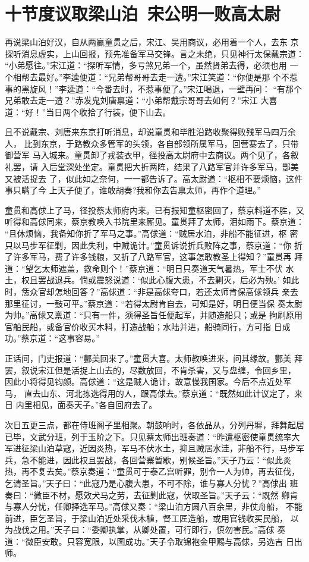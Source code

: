 \chapter{十节度议取梁山泊~宋公明一败高太尉}

再说梁山泊好汉，自从两赢童贯之后，宋江、吴用商议，必用着一个人，去东
京探听消息虚实，上山回报，预先准备军马交锋。言之未绝，只见神行太保戴宗道：
“小弟愿往。”宋江道：“探听军情，多亏煞兄弟一个，虽然贤弟去得，必须也用
一个相帮去最好。”李逵便道：“兄弟帮哥哥去走一遭。”宋江笑道：“你便是那
个不惹事的黑旋风！”李逵道：“今番去时，不惹事便了。”宋江喝退，一壁再问：
“有那个兄弟敢去走一遭？”赤发鬼刘唐禀道：“小弟帮戴宗哥哥去如何？”宋江
大喜道：“好！”当日两个收拾了行装，便下山去。

且不说戴宗、刘唐来东京打听消息，却说童贯和毕胜沿路收聚得败残军马四万余人，
比到东京，于路教众多管军的头领，各自部领所属军马，回营寨去了，只带御营军
马入城来。童贯卸了戎装衣甲，径投高太尉府中去商议。两个见了，各叙礼罢，请
入后堂深处坐定。童贯把大折两阵，结果了八路军官并许多军马，酆美又被活捉去
了，似此如之奈何，一一都告诉了。高太尉道：“枢相不要烦恼，这件事只瞒了今
上天子便了，谁敢胡奏?我和你去告禀太师，再作个道理。”

童贯和高俅上了马，径投蔡太师府内来。已有报知童枢密回了，蔡京料道不胜，又
听得和高俅同来，蔡京教唤入书院里来厮见。童贯拜了太师，泪如雨下。蔡京道：
“且休烦恼，我备知你折了军马之事。”高俅道：“贼居水泊，非船不能征进，枢
密只以马步军征剿，因此失利，中贼诡计。”童贯诉说折兵败阵之事，蔡京道：“你
折了许多军马，费了许多钱粮，又折了八路军官，这事怎敢教圣上得知？”童贯再
拜道：“望乞太师遮盖，救命则个！”蔡京道：“明日只奏道天气暑热，军士不伏
水土，权且罢战退兵。倘或震怒说道：‘似此心腹大患，不去剿灭，后必为殃。’
如此时，恁众官却怎地回答？”高俅道：“非是高俅夸口，若还太师肯保高俅领兵
亲去那里征讨，一鼓可平。”蔡京道：“若得太尉肯自去，可知是好，明日便当保
奏太尉为帅。”高俅又禀道：“只有一件，须得圣旨任便起军，并随造船只；或是
拘刷原用官船民船，或备官价收买木料，打造战船；水陆并进，船骑同行，方可指
日成功。”蔡京道：“这事容易。”

正话间，门吏报道：“酆美回来了。”童贯大喜。太师教唤进来，问其缘故。酆美
拜罢，叙说宋江但是活捉上山去的，尽数放回，不肯杀害，又与盘缠，令回乡里，
因此小将得见钧颜。高俅道：“这是贼人诡计，故意慢我国家。今后不点近处军马，
直去山东、河北拣选得用的人，跟高俅去。”蔡京道：“既然如此计议定了，来日
内里相见，面奏天子。”各自回府去了。

次日五更三点，都在侍班阁子里相聚。朝鼓响时，各依品从，分列丹墀，拜舞起居
已毕，文武分班，列于玉阶之下。只见蔡太师出班奏道：“昨遣枢密使童贯统率大
军进征梁山泊草寇，近因炎热，军马不伏水土，抑且贼居水洼，非船不行，马步军
兵，急不能进，因此权且罢战，各回营寨暂歇，别候圣旨。”天子乃云：“似此炎
热，再不复去矣。”蔡京奏道：“童贯可于泰乙宫听罪，别令一人为帅，再去征伐，
乞请圣旨。”天子曰：“此寇乃是心腹大患，不可不除，谁与寡人分忧？”高俅出
班奏曰：“微臣不材，愿效犬马之劳，去征剿此寇，伏取圣旨。”天子云：“既然
卿肯与寡人分忧，任卿择选军马。”高俅又奏：“梁山泊方圆八百余里，非仗舟船，
不能前进，臣乞圣旨，于梁山泊近处采伐木植，督工匠造船，或用官钱收买民船，
以为战伐之用。”天子曰：“委卿执掌，从卿处置，可行即行，慎勿害民。”高俅
奏道：“微臣安敢。只容宽限，以图成功。”天子令取锦袍金甲赐与高俅，另选吉
日出师。

